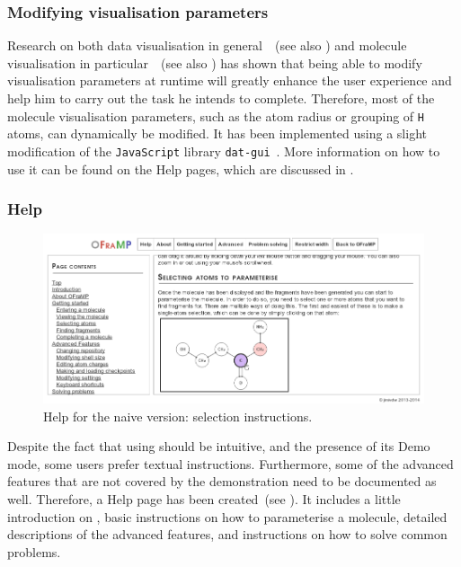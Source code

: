 \subsubsection{Modifying visualisation parameters}
Research on both data visualisation in general~\cite{gallopoulos1994computer}~(see also ) and molecule visualisation in particular~\cite{aksela2008computer,taylor2013interface}~(see also ) has shown that being able to modify visualisation parameters at runtime will greatly enhance the user experience and help him to carry out the task he intends to complete. Therefore, most of the molecule visualisation parameters, such as the atom radius or grouping of \verb|H| atoms, can dynamically be modified. It has been implemented using a slight modification of the \verb|JavaScript| library \verb|dat-gui|~\cite{data2011dat}. More information on how to use it can be found on the \oframp{} Help pages, which are discussed in .

\subsubsection{Help}

\begin{figure}
\center
\includegraphics[width=.9\textwidth]{img/help.png}
\caption{\oframp{} Help for the naive version: selection instructions.}
\end{figure}

Despite the fact that using \oframp{} should be intuitive, and the presence of its Demo mode, some users prefer textual instructions. Furthermore, some of the advanced features that are not covered by the demonstration need to be documented as well. Therefore, a Help page has been created~(see ). It includes a little introduction on \oframp, basic instructions on how to parameterise a molecule, detailed descriptions of the advanced features, and instructions on how to solve common problems.

